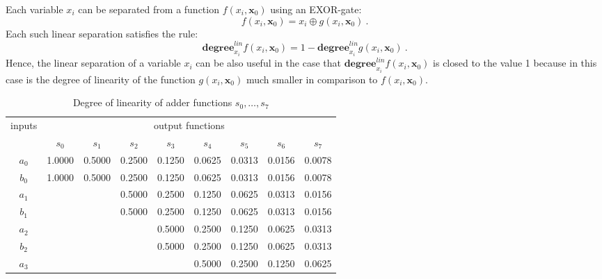\documentclass[a4paper]{article}
\newcommand\bx{\mathbf{x}}
\begin{document}
Each variable $x_i$ can be separated from a function $f(x_i,\bx_0)$ using an EXOR-gate:
\begin{equation}
f(x_i,\bx_0)= x_i \oplus g(x_i,\bx_0)~.
\label{equ:gen_lin_sep_xi}
\end{equation}
Each such linear separation satisfies the rule:
\begin{equation}
	\mathbf{degree}^{lin}_{x_i}f(x_i,\bx_0) = 1 - \mathbf{degree}^{lin}_{x_i}g(x_i,\bx_0)~.
\end{equation}
Hence, the linear separation of a variable $x_i$ can be also useful in the case that $\mathbf{degree}^{lin}_{x_i}f(x_i,\bx_0)$ is closed to the value 1 because in this case is the degree of linearity of the function $g(x_i,\bx_0)$ much smaller in comparison to $f(x_i,\bx_0)$.
\begin{table}
	\centering
	\caption{Degree of linearity of adder functions $s_0,\dots , s_7 $}
	\vspace{6pt}		
	\label{tab:dl_add_s0_s8}
		\begin{tabular}{ccccccccc}
\toprule
inputs & \multicolumn{8}{c}{output functions} \\
\cmidrule{2-9}
       & $s_0$  & $s_1$  & $s_2$  & $s_3$  & $s_4$  & $s_5$  & $s_6$  & $s_7$  \\%
\midrule
$a_0$	&  1.0000 & 0.5000 & 0.2500 & 0.1250 & 0.0625 & 0.0313 & 0.0156 & 0.0078 \\ %
$b_0$	&  1.0000 & 0.5000 & 0.2500 & 0.1250 & 0.0625 & 0.0313 & 0.0156 & 0.0078 \\ %
$a_1$	&         &        & 0.5000 & 0.2500 & 0.1250 & 0.0625 & 0.0313 & 0.0156 \\ %
$b_1$	&         &        & 0.5000 & 0.2500 & 0.1250 & 0.0625 & 0.0313 & 0.0156 \\ %
$a_2$	&         &        &        & 0.5000 & 0.2500 & 0.1250 & 0.0625 & 0.0313 \\ %
$b_2$	&         &        &        & 0.5000 & 0.2500 & 0.1250 & 0.0625 & 0.0313 \\ %
$a_3$	&         &        &        &        & 0.5000 & 0.2500 & 0.1250 & 0.0625 \\ %

\end{tabular}
\end{table}
\end{document}
